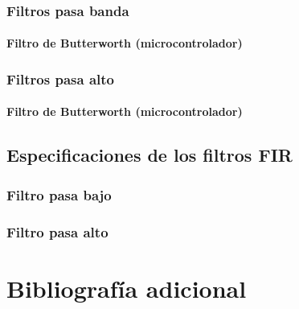 \documentclass[oneside,a4paper,10pt]{scrbook}
\begin{document}
{{ 			\clearpage	
			
			\subsection{Filtros pasa banda}
			{
				\subsubsection{Filtro de Butterworth  (microcontrolador)}
				{
					
				}
			}
	
			\clearpage				
			
			\subsection{Filtros pasa alto}
			{
				\subsubsection{Filtro de Butterworth  (microcontrolador)}
				{
								
				}
			}					
		}
		
		\clearpage			
		
		\section{Especificaciones de los filtros FIR}
		{
			\subsection{Filtro pasa bajo}
			{
				
			}
			
			\clearpage			

			\subsection{Filtro pasa alto}
			{
				
			}
		}
	}
	
	\clearpage			
	
%		
	
	\chapter{Bibliografía adicional}
	{
		
	}	
	
	\clearpage
\end{document}
